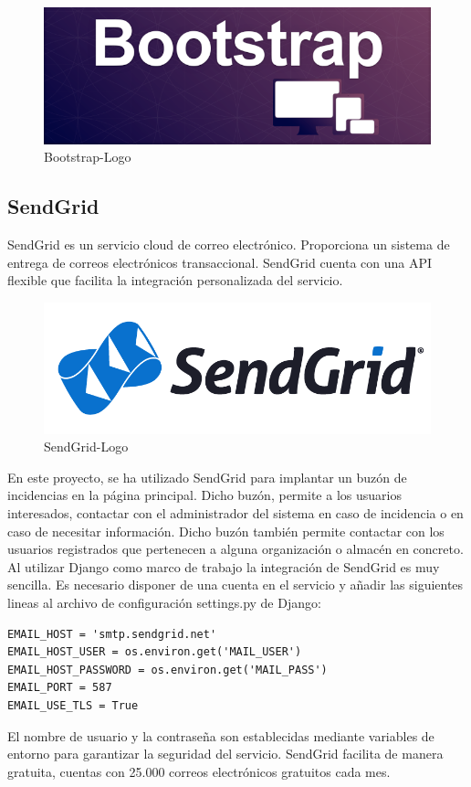\documentclass[a4paper,11pt]{book}
\begin{document}
\begin{figure}[H] 
\centering 
\includegraphics[scale=0.25]{imagenes/desarrollo_herramienta/bootstrap.png}
\caption{ Bootstrap-Logo\cite{booL}  }  
\end{figure}  

\subsection{SendGrid}
SendGrid\cite{sg} es un servicio cloud de correo electrónico. Proporciona un sistema de entrega de correos electrónicos transaccional. SendGrid cuenta con una API flexible que facilita la integración personalizada del servicio. 

\begin{figure}[H] 
\centering 
\includegraphics[scale=0.25]{imagenes/desarrollo_herramienta/sendgrid.png}
\caption{ SendGrid-Logo\cite{sgL}  }  
\end{figure}  

En este proyecto, se ha utilizado SendGrid para implantar un buzón de incidencias en la página principal. Dicho buzón, permite a los usuarios interesados, contactar con el administrador del sistema en caso de incidencia o en caso de necesitar información. Dicho buzón también permite contactar con los usuarios registrados que pertenecen a alguna organización o almacén en concreto. Al utilizar Django como marco de trabajo la integración de  SendGrid  es muy sencilla. Es necesario disponer de una cuenta en el servicio y añadir las siguientes lineas al archivo de configuración settings.py de Django:
\begin{lstlisting}
EMAIL_HOST = 'smtp.sendgrid.net'
EMAIL_HOST_USER = os.environ.get('MAIL_USER')
EMAIL_HOST_PASSWORD = os.environ.get('MAIL_PASS')
EMAIL_PORT = 587
EMAIL_USE_TLS = True
\end{lstlisting}
El nombre de usuario y la contraseña son establecidas mediante variables de entorno para garantizar la seguridad del servicio. SendGrid facilita de manera gratuita, cuentas con 25.000 correos electrónicos gratuitos cada mes.  
 
\end{document}
